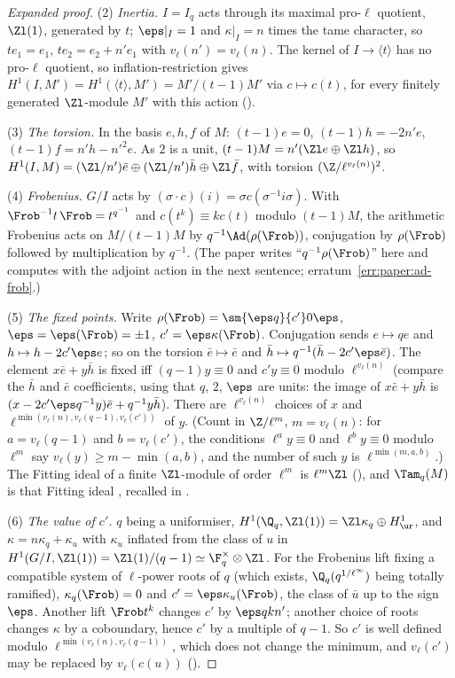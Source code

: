 \begin{sloppypar}
\begin{proof}[Expanded proof]
(2) \emph{Inertia.} $I=I_q$ acts through its maximal pro-$\ell$ quotient, $\Zl(1)$, generated by $t$; $\eps|_I=1$ and $\kappa|_I=n$ times the tame character, so $te_1=e_1$,
$te_2=e_2+n'e_1$ with $v_\ell(n')=v_\ell(n)$. The kernel of $I\to\langle t\rangle$ has no pro-$\ell$ quotient, so inflation-restriction gives $H^1(I,M')=H^1(\langle t\rangle,M')=M'/(t-1)M'$
via $c\mapsto c(t)$, for every finitely generated $\Zl$-module $M'$ with this action ().

(3) \emph{The torsion.} In the basis $e,h,f$ of $M$: $(t-1)e=0$, $(t-1)h=-2n'e$, $(t-1)f=n'h-n'^2e$. As $2$ is a unit, $(t-1)M=n'(\Zl e\oplus\Zl h)$, so
$H^1(I,M)=(\Zl/n')\bar e\oplus(\Zl/n')\bar h\oplus\Zl\bar f$, with torsion $(\Z/\ell^{v_\ell(n)})^2$.

(4) \emph{Frobenius.} $G/I$ acts by $(\sigma\cdot c)(i)=\sigma c(\sigma^{-1}i\sigma)$. With $\Frob^{-1}t\,\Frob=t^{q^{-1}}$ and $c(t^k)\equiv kc(t)$ modulo $(t-1)M$, the arithmetic Frobenius acts on
$M/(t-1)M$ by $q^{-1}\Ad(\rho(\Frob))$, conjugation by $\rho(\Frob)$ followed by multiplication by $q^{-1}$. (The paper writes ``$q^{-1}\rho(\Frob)$'' here and computes with the
adjoint action in the next sentence; erratum~\ref{err:paper:ad-frob}.)

(5) \emph{The fixed points.} Write $\rho(\Frob)=\sm{\eps q}{c'}0{\eps}$, $\eps=\eps(\Frob)=\pm1$, $c'=\eps\kappa(\Frob)$. Conjugation sends $e\mapsto qe$ and $h\mapsto h-2c'\eps e$; so on the torsion
$\bar e\mapsto\bar e$ and $\bar h\mapsto q^{-1}(\bar h-2c'\eps\bar e)$. The element $x\bar e+y\bar h$ is fixed iff $(q-1)y\equiv0$ and $c'y\equiv0$ modulo $\ell^{v_\ell(n)}$ (compare the $\bar h$ and $\bar e$
coefficients, using that $q$, $2$, $\eps$ are units: the image of $x\bar e+y\bar h$ is $(x-2c'\eps q^{-1}y)\bar e+q^{-1}y\bar h$). There are $\ell^{v_\ell(n)}$ choices of $x$ and $\ell^{\min(v_\ell(n),v_\ell(q-1),v_\ell(c'))}$ of $y$.
(Count in $\Z/\ell^m$, $m=v_\ell(n)$: for $a=v_\ell(q-1)$ and $b=v_\ell(c')$, the conditions $\ell^ay\equiv0$ and $\ell^by\equiv0$ modulo $\ell^m$ say $v_\ell(y)\ge m-\min(a,b)$, and the number of such $y$ is
$\ell^{\min(m,a,b)}$.) The Fitting ideal of a finite $\Zl$-module of order
$\ell^m$ is $\ell^m\Zl$ (), and $\Tam_q(M)$ is that Fitting ideal \cite[I.4.2.2]{FPR94}, recalled in \cite[p.~708]{DFG04}.

(6) \emph{The value of $c'$.} $q$ being a uniformiser, $H^1(\Q_q,\Zl(1))=\Zl\kappa_q\oplus H^1_{\ur}$, and $\kappa=n\kappa_q+\kappa_u$ with $\kappa_u$ inflated from the class of $u$ in
$H^1(G/I,\Zl(1))=\Zl(1)/(q-1)\simeq\F_q^\times\otimes\Zl$. For the Frobenius lift fixing a compatible system of $\ell$-power roots of $q$ (which exists, $\Q_q(q^{1/\ell^\infty})$ being totally
ramified), $\kappa_q(\Frob)=0$ and $c'=\eps\kappa_u(\Frob)$, the class of $\bar u$ up to the sign $\eps$. Another lift $\Frob t^k$ changes $c'$ by $\eps qkn'$; another choice of roots changes $\kappa$ by
a coboundary, hence $c'$ by a multiple of $q-1$. So $c'$ is well defined modulo $\ell^{\min(v_\ell(n),v_\ell(q-1))}$, which does not change the minimum, and $v_\ell(c')$ may be replaced by
$v_\ell(c(u))$ ().


\end{proof}
\end{sloppypar}
